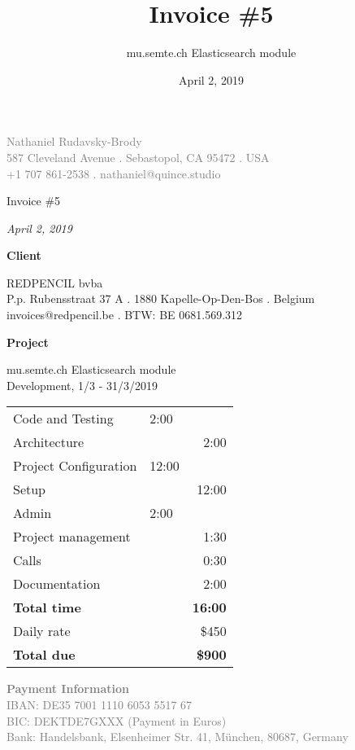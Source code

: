 \documentclass[11pt]{article}
\author{mu.semte.ch Elasticsearch module}
\date{April 2, 2019}
\title{Invoice \#5}
\begin{document}
 \thispagestyle{empty}
\centering

{\small\textcolor{gray}{
Nathaniel Rudavsky-Brody \\
587 Cleveland Avenue . Sebastopol, CA 95472 . USA\\
+1 707 861-2538  . nathaniel@quince.studio\\
}}

\vspace{4em}

{\Huge Invoice \#5}

\vspace{1em}

{\textit{April 2, 2019}}

\vspace{1em}

{\Large\textbf{Client}}

REDPENCIL bvba\\
P.p. Rubensstraat 37 A . 1880 Kapelle-Op-Den-Bos . Belgium\\
invoices@redpencil.be . BTW: BE 0681.569.312

\vspace{1em}

{\Large\textbf{Project}}

 mu.semte.ch Elasticsearch module\\
 Development, 1/3 - 31/3/2019

\vspace{1em}



\begin{table}[htb]
\centering

\begin{tabular}{llr}


\hline


\hline


\hline
Code and Testing & 2:00 & \\
\hspace*{1em} Architecture &  & 2:00\\
Project Configuration & 12:00 & \\
\hspace*{1em} Setup &  & 12:00\\
Admin & 2:00 & \\
\hspace*{1em} Project management &  & 1:30\\
\hspace*{1em} Calls &  & 0:30\\
\hspace*{1em} Documentation &  & 2:00\\


\hline
\textbf{Total time} & & \textbf{	16:00} \\

Daily rate & & \$450 \\

\textbf{Total due} & & \textbf{\$900} \\
\end{tabular}
\end{table}

\vspace{\fill}



\textcolor{gray}{\small
\textbf{Payment Information}\\
IBAN: DE35 7001 1110 6053 5517 67 \\
BIC: DEKTDE7GXXX  (Payment in Euros) \\
Bank: Handelsbank, Elsenheimer Str. 41, München, 80687, Germany
}
\end{document}
